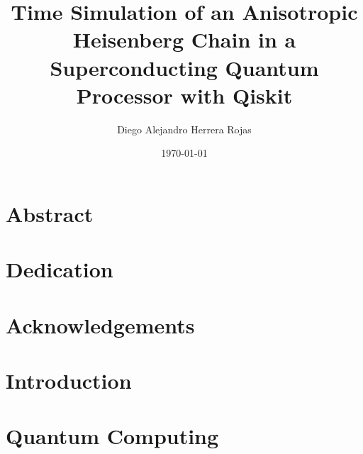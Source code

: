 \documentclass[12pt,twoside]{report}
\title{Time Simulation of an Anisotropic Heisenberg Chain in a Superconducting Quantum Processor with Qiskit}
\author{Diego Alejandro Herrera Rojas}
\date{\today}
\begin{document}
  
  \chapter*{Abstract}
  \lipsum[2-4]
  \chapter*{Dedication}
  \lipsum[2-2]
  \chapter*{Acknowledgements}
  \lipsum[4-4]
  \tableofcontents
  \chapter{Introduction}
  
  \chapter{Quantum Computing}
  
\end{document}
